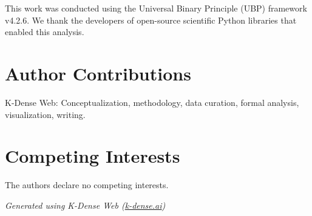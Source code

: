 \documentclass[11pt,letterpaper]{article}
\begin{document}
This work was conducted using the Universal Binary Principle (UBP) framework v4.2.6. We thank the developers of open-source scientific Python libraries that enabled this analysis.

\section*{Author Contributions}

K-Dense Web: Conceptualization, methodology, data curation, formal analysis, visualization, writing.

\section*{Competing Interests}

The authors declare no competing interests.

\newpage



\vfill
\begin{center}
\small
\textit{Generated using K-Dense Web (\href{https://k-dense.ai}{k-dense.ai})}
\end{center}
\end{document}

